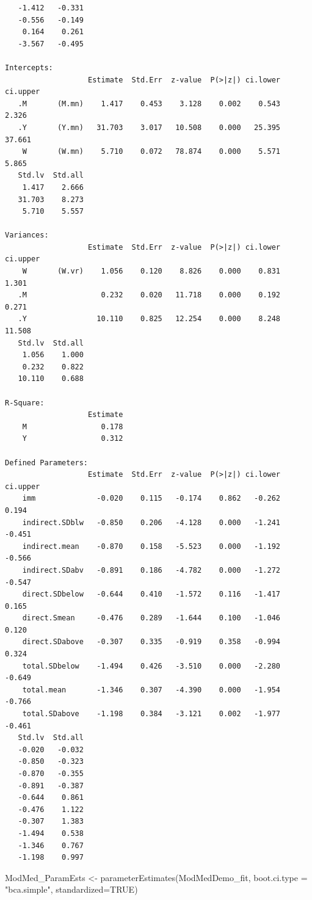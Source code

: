 \documentclass[
]{book}
\newenvironment{Shaded}{\begin{snugshade}}{\end{snugshade}}
\newcommand{\AttributeTok}[1]{\textcolor[rgb]{0.77,0.63,0.00}{#1}}
\newcommand{\ConstantTok}[1]{\textcolor[rgb]{0.00,0.00,0.00}{#1}}
\newcommand{\FunctionTok}[1]{\textcolor[rgb]{0.00,0.00,0.00}{#1}}
\newcommand{\NormalTok}[1]{#1}
\newcommand{\OtherTok}[1]{\textcolor[rgb]{0.56,0.35,0.01}{#1}}
\newcommand{\StringTok}[1]{\textcolor[rgb]{0.31,0.60,0.02}{#1}}
\begin{document}
\begin{verbatim}
   -1.412   -0.331
   -0.556   -0.149
    0.164    0.261
   -3.567   -0.495

Intercepts:
                   Estimate  Std.Err  z-value  P(>|z|) ci.lower ci.upper
   .M       (M.mn)    1.417    0.453    3.128    0.002    0.543    2.326
   .Y       (Y.mn)   31.703    3.017   10.508    0.000   25.395   37.661
    W       (W.mn)    5.710    0.072   78.874    0.000    5.571    5.865
   Std.lv  Std.all
    1.417    2.666
   31.703    8.273
    5.710    5.557

Variances:
                   Estimate  Std.Err  z-value  P(>|z|) ci.lower ci.upper
    W       (W.vr)    1.056    0.120    8.826    0.000    0.831    1.301
   .M                 0.232    0.020   11.718    0.000    0.192    0.271
   .Y                10.110    0.825   12.254    0.000    8.248   11.508
   Std.lv  Std.all
    1.056    1.000
    0.232    0.822
   10.110    0.688

R-Square:
                   Estimate
    M                 0.178
    Y                 0.312

Defined Parameters:
                   Estimate  Std.Err  z-value  P(>|z|) ci.lower ci.upper
    imm              -0.020    0.115   -0.174    0.862   -0.262    0.194
    indirect.SDblw   -0.850    0.206   -4.128    0.000   -1.241   -0.451
    indirect.mean    -0.870    0.158   -5.523    0.000   -1.192   -0.566
    indirect.SDabv   -0.891    0.186   -4.782    0.000   -1.272   -0.547
    direct.SDbelow   -0.644    0.410   -1.572    0.116   -1.417    0.165
    direct.Smean     -0.476    0.289   -1.644    0.100   -1.046    0.120
    direct.SDabove   -0.307    0.335   -0.919    0.358   -0.994    0.324
    total.SDbelow    -1.494    0.426   -3.510    0.000   -2.280   -0.649
    total.mean       -1.346    0.307   -4.390    0.000   -1.954   -0.766
    total.SDabove    -1.198    0.384   -3.121    0.002   -1.977   -0.461
   Std.lv  Std.all
   -0.020   -0.032
   -0.850   -0.323
   -0.870   -0.355
   -0.891   -0.387
   -0.644    0.861
   -0.476    1.122
   -0.307    1.383
   -1.494    0.538
   -1.346    0.767
   -1.198    0.997
\end{verbatim}

\begin{Shaded}
\begin{Highlighting}[]
\NormalTok{ModMed\_ParamEsts }\OtherTok{\textless{}{-}} \FunctionTok{parameterEstimates}\NormalTok{(ModMedDemo\_fit, }\AttributeTok{boot.ci.type =} \StringTok{"bca.simple"}\NormalTok{, }\AttributeTok{standardized=}\ConstantTok{TRUE}\NormalTok{)}
\end{Highlighting}
\end{Shaded}
\end{document}
